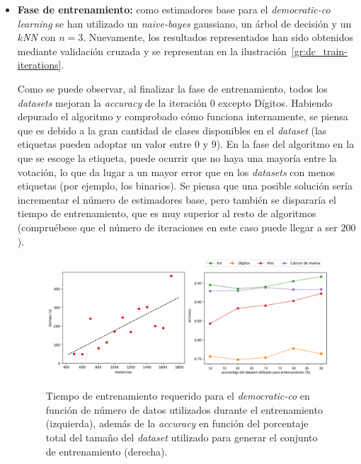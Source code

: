 \begin{itemize}
	\item \textbf{Fase de entrenamiento:} como estimadores base para el \textit{democratic-co learning} se han utilizado un \textit{naive-bayes} gaussiano, un árbol de decisión y un \textit{$k$NN} con $n = 3$. Nuevamente, los resultados representados han sido obtenidos mediante validación cruzada y se representan en la ilustración~\ref{gr:dc_train-iterations}.
	
	Como se puede observar, al finalizar la fase de entrenamiento, todos los \textit{datasets} mejoran la \textit{accuracy} de la iteración 0 excepto Dígitos. Habiendo depurado el algoritmo y comprobado cómo funciona internamente, se piensa que es debido a la gran cantidad de clases disponibles en el \textit{dataset} (las etiquetas pueden adoptar un valor entre $0$ y $9$). En la fase del algoritmo en la que se escoge la etiqueta, puede ocurrir que no haya una mayoría entre la votación, lo que da lugar a un mayor error que en los \textit{datasets} con menos etiquetas (por ejemplo, los binarios). Se piensa que una posible solución sería incrementar el número de estimadores base, pero también se dispararía el tiempo de entrenamiento, que es muy superior al resto de algoritmos (compruébese que el número de iteraciones en este caso puede llegar a ser $200$).
	
\begin{figure}[h]
	\caption[\textit{Democratic-co}: resultados (tiempo-porcentaje)]{Tiempo de entrenamiento requerido para el \textit{democratic-co} en función de número de datos utilizados durante el entrenamiento (izquierda), además de la \textit{accuracy} en función del porcentaje total del tamaño del \textit{dataset} utilizado para generar el conjunto de entrenamiento (derecha).}
	\centering
	\includegraphics[width=\textwidth]{../img/memoria/5_democraticco_time-percentage}
	\label{gr:dc_time-percentage}
\end{figure}
	

\end{itemize}

